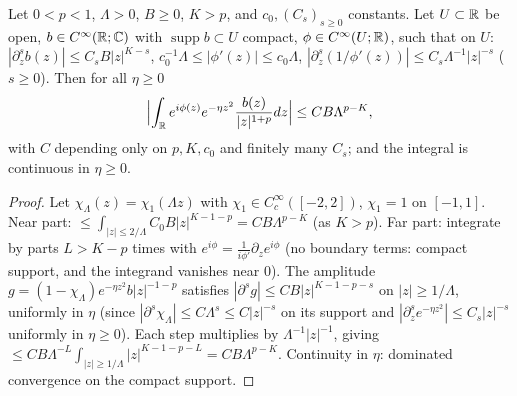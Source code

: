 \begin{lemma}
  \label{lem:c03_ibp_homogeneous}
  Let $0<p<1$, $\Lambda>0$, $B\ge0$, $K>p$, and $c_0,(C_s)_{s\ge0}$ constants. Let $U\subset\mathbb{R}$ be open, $b\in C^\infty(\mathbb{R};\mathbb{C})$ with $\operatorname{supp}b\subset U$ compact, $\phi\in C^\infty(U;\mathbb{R})$, such that on $U$:
  $|\partial^s_zb(z)|\le C_sB|z|^{K-s}$, $c_0^{-1}\Lambda\le|\phi'(z)|\le c_0\Lambda$, $|\partial_z^s(1/\phi'(z))|\le C_s\Lambda^{-1}|z|^{-s}$ ($s\ge0$). Then for all $\eta\ge0$
  \[
    \Bigl|\int_{\mathbb{R}} e^{i\phi(z)}e^{-\eta z^2}\frac{b(z)}{|z|^{1+p}}dz\Bigr|\le C B\Lambda^{p-K},
  \]
  with $C$ depending only on $p,K,c_0$ and finitely many $C_s$; and the integral is continuous in $\eta\ge0$.
\end{lemma}
\begin{proof}
  Let $\chi_\Lambda(z)=\chi_1(\Lambda z)$ with $\chi_1\in C_c^\infty([-2,2])$, $\chi_1=1$ on $[-1,1]$. Near part: $\le\int_{|z|\le2/\Lambda}C_0B|z|^{K-1-p}=CB\Lambda^{p-K}$ (as $K>p$).
  Far part: integrate by parts $L>K-p$ times with $e^{i\phi}=\frac1{i\phi'}\partial_ze^{i\phi}$ (no boundary terms: compact support, and the integrand vanishes near $0$).
  The amplitude $g=(1-\chi_\Lambda)e^{-\eta z^2}b|z|^{-1-p}$ satisfies $|\partial^sg|\le CB|z|^{K-1-p-s}$ on $|z|\ge1/\Lambda$, uniformly in $\eta$ (since $|\partial^s\chi_\Lambda|\le C\Lambda^s\le C|z|^{-s}$ on its support and $|\partial_z^se^{-\eta z^2}|\le C_s|z|^{-s}$ uniformly in $\eta\ge0$).
  Each step multiplies by $\Lambda^{-1}|z|^{-1}$, giving $\le CB\Lambda^{-L}\int_{|z|\ge1/\Lambda}|z|^{K-1-p-L}=CB\Lambda^{p-K}$. Continuity in $\eta$: dominated convergence on the compact support.
\end{proof}


